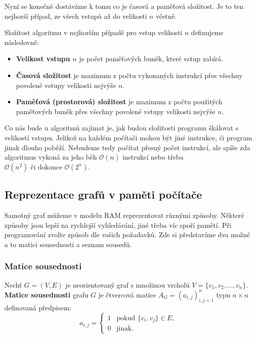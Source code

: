 \bigskip

\noindent Nyní se konečně dostáváme k tomu co je časová a paměťová složitost. Je to ten nejhorší případ, ze všech vstupů až do velikosti $n$ včetně.

\medskip

\begin{definition}
Složitost algoritmu v nejhorším případě pro vstup velikosti $n$ definujeme následovně:
\begin{itemize}
    \item \textbf{Velikost vstupu $n$} je počet paměťových buněk, které vstup zabírá.
    \item \textbf{Časová složitost} je maximum z počtu vykonaných instrukcí přes všechny povolené vstupy velikosti nejvýše $n$.
    \item \textbf{Paměťová (prostorová) složitost} je maximum z počtu použitých paměťových buněk přes všechny povolené vstupy velikosti nejvýše $n$.
\end{itemize}
\end{definition}


\noindent Co nás bude u algoritmů zajímat je, jak budou složitosti programu škálovat s velikostí vstupu. Jelikož na každém počítači mohou být jiné instrukce, či program jinak dlouho poběží. Nebudeme tedy počítat přesný počet instrukcí, ale spíše zda algoritmus vykoná za jeho běh $\mathcal{O}(n)$ instrukcí nebo třeba $\mathcal{O}(n^2) \text{ či dokonce } \mathcal{O}(2^n)$.

\subsection{Reprezentace grafů v paměti počítače}

Samotný graf můžeme v modelu RAM reprezentovat různými způsoby. Některé způsoby jsou lepší na rychlejší vyhledávání, jiné třeba víc spoří pamětí. Při programování zvolte způsob dle vašich požadavků. Zde si představíme dva možné a to matici sousednosti a seznam sousedů. \bigskip

\subsubsection{Matice sousednosti}
\begin{definition}
Nechť $G = (V, E)$ je neorientovaný graf s množinou vrcholů $V = \{v_1, v_2, \dots, v_n\}$. \textbf{Matice sousednosti} grafu $G$ je čtvercová matice $A_G = (a_{i,j})_{i,j=1}^n$ typu $n \times n$ definovaná předpisem:
$$a_{i,j} = \begin{cases} 1 & \text{pokud } \{v_i, v_j\} \in E, \\ 0 & \text{jinak.} \end{cases}$$
\end{definition} \bigskip

